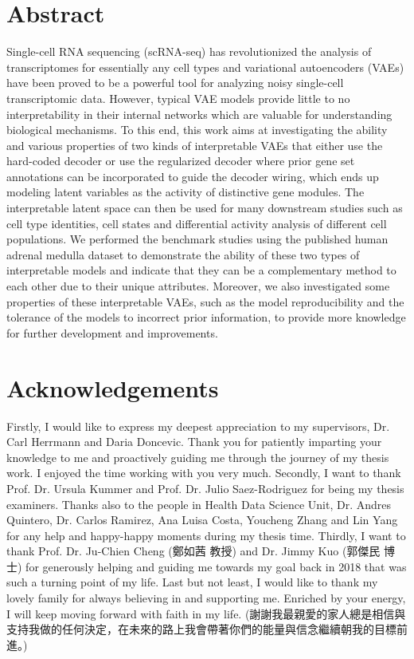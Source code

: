 \documentclass{report}
\begin{document}
\chapter*{Abstract}
Single-cell RNA sequencing (scRNA-seq) has revolutionized the analysis of transcriptomes for essentially any cell types and variational autoencoders (VAEs) have been proved to be a powerful tool for analyzing noisy single-cell transcriptomic data. However, typical VAE models provide little to no interpretability in their internal networks which are valuable for understanding biological mechanisms. To this end, this work aims at investigating the ability and various properties of two kinds of interpretable VAEs that either use the hard-coded decoder or use the regularized decoder where prior gene set annotations can be incorporated to guide the decoder wiring, which ends up modeling latent variables as the activity of distinctive gene modules. The interpretable latent space can then be used for many downstream studies such as cell type identities, cell states and differential activity analysis of different cell populations. We performed the benchmark studies using the published human adrenal medulla dataset to demonstrate the ability of these two types of interpretable models and indicate that they can be a complementary method to each other due to their unique attributes. Moreover, we also investigated some properties of these interpretable VAEs, such as the model reproducibility and the tolerance of the models to incorrect prior information, to provide more knowledge for further development and improvements.

\chapter*{Acknowledgements}
\begin{CJK*}{UTF8}{bsmi}
Firstly, I would like to express my deepest appreciation to my supervisors, Dr. Carl Herrmann and Daria Doncevic. Thank you for patiently imparting your knowledge to me and proactively guiding me through the journey of my thesis work. I enjoyed the time working with you very much. Secondly, I want to thank Prof. Dr. Ursula Kummer and Prof. Dr. Julio Saez-Rodriguez for being my thesis examiners. Thanks also to the people in Health Data Science Unit, Dr. Andres Quintero, Dr. Carlos Ramirez, Ana Luisa Costa, Youcheng Zhang and Lin Yang for any help and happy-happy moments during my thesis time. Thirdly, I want to thank Prof. Dr. Ju-Chien Cheng (鄭如茜 教授) and Dr. Jimmy Kuo (郭傑民 博士) for generously helping and guiding me towards my goal back in 2018 that was such a turning point of my life. Last but not least, I would like to thank my lovely family for always believing in and supporting me. Enriched by your energy, I will keep moving forward with faith in my life. (謝謝我最親愛的家人總是相信與支持我做的任何決定，在未來的路上我會帶著你們的能量與信念繼續朝我的目標前進。)
\end{CJK*}
\end{document}
